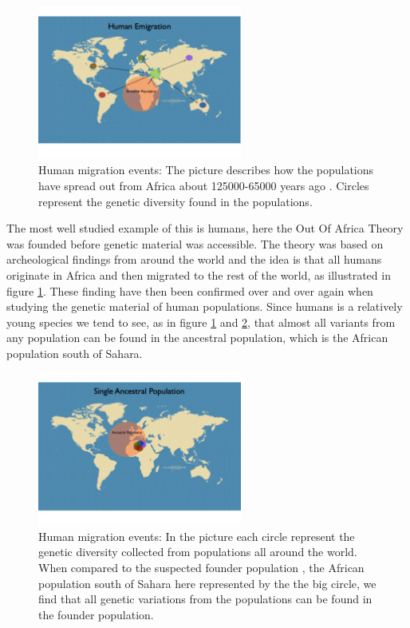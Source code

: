 \begin{figure}[ht]
	\centering
		\includegraphics[width=0.6\textwidth]{../pictures/Single_origin_1.jpg}
	\caption{Human migration events: The picture describes how the populations have spread out from Africa about 125000-65000 years ago \cite{born_in_africa}. Circles represent the genetic diversity found in the populations.}
	\label{fig:human_migrations}
\end{figure}


The most well studied example of this is humans, here the Out Of Africa Theory was founded before genetic material was accessible. The theory was based on archeological findings from around the world and the idea is that all humans originate in Africa and then migrated to the rest of the world, as illustrated in figure \ref{fig:human_migrations}. These finding have then been confirmed over and over again when studying the genetic material of human populations. Since humans is a relatively young species we tend to see, as in figure \ref{fig:human_migrations} and \ref{fig:single_origin}, that almost all variants from any population can be found in the ancestral population, which is the African population south of Sahara.\\


\begin{figure}[ht]
	\centering
		\includegraphics[width=0.6\textwidth]{../pictures/Single_origin_2.jpg}
	\caption{Human migration events: In the picture each circle represent the genetic diversity collected from populations all around the world. When compared to the suspected founder population , the African population south of Sahara here  represented by the the big circle, we find that all genetic variations from the populations can be found in the founder population.}
	\label{fig:single_origin}
\end{figure}



